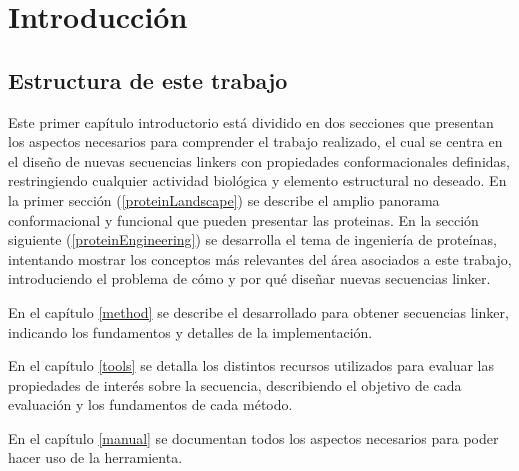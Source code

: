 \chapter{Introducci\'on}



\section{Estructura de este trabajo}

Este primer capítulo introductorio está dividido en dos secciones que presentan los aspectos necesarios para comprender el trabajo realizado, el cual se centra en el diseño de nuevas secuencias linkers con 
propiedades conformacionales definidas, restringiendo cualquier actividad biológica y elemento estructural no deseado.
En la primer sección (\ref{proteinLandscape}) se describe el amplio panorama conformacional y funcional que pueden presentar las proteinas.
En la sección siguiente (\ref{proteinEngineering}) se desarrolla el tema de ingeniería de proteínas, intentando mostrar los conceptos más relevantes del área asociados a este trabajo, 
introduciendo el problema de cómo y por qué diseñar nuevas secuencias linker.

En el capítulo \ref{method} se describe el desarrollado para obtener secuencias linker, indicando los fundamentos y detalles de la implementación.

En el capítulo \ref{tools} se detalla los distintos recursos utilizados para evaluar las propiedades de interés sobre la secuencia, describiendo el objetivo de cada evaluación y los fundamentos de cada método. 

En el capítulo \ref{manual} se documentan todos los aspectos necesarios para poder hacer uso de la herramienta.

